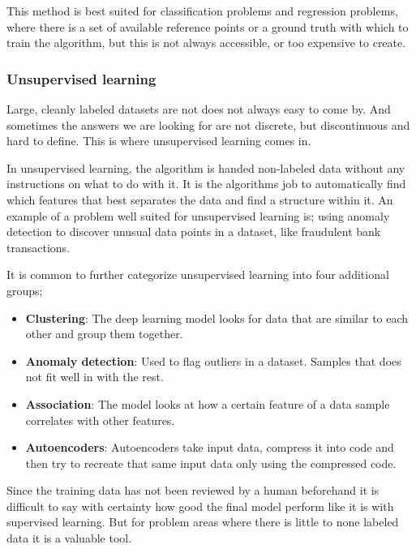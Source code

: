 \documentclass[thesis.tex]{subfiles}
\begin{document}
This method is best suited for classification problems and regression problems, where there is a set of available reference points or a ground truth with which to train the algorithm, but this is not always accessible, or too expensive to create.


\subsubsection{Unsupervised learning} \label{sec:unsupervised_learning}
Large, cleanly labeled datasets are not does not always easy to come by. And sometimes the answers we are looking for are not discrete, but discontinuous and hard to define. This is where unsupervised learning comes in.

In unsupervised learning, the algorithm is handed non-labeled data without any instructions on what to do with it. It is the algorithms job to automatically find which features that best separates the data and find a structure within it.	An example of a problem well suited for unsupervised learning is; using anomaly detection to discover unusual data points in a dataset, like fraudulent bank transactions.

It is common to further categorize unsupervised learning into four additional groups;

\begin{itemize}
\item \textbf{Clustering}: The deep learning model looks for data that are similar to each other and group them together.
\item \textbf{Anomaly detection}: Used to flag outliers in a dataset. Samples that does not fit well in with the rest.
\item \textbf{Association}: The model looks at how a certain feature of a data sample correlates with other features.
\item \textbf{Autoencoders}: Autoencoders take input data, compress it into code and then try to recreate that same input data only using the compressed code.
\end{itemize}

Since the training data has not been reviewed by a human beforehand it is difficult to say with certainty how good the final model perform like it is with supervised learning. But for problem areas where there is little to none labeled data it is a valuable tool.
\end{document}
